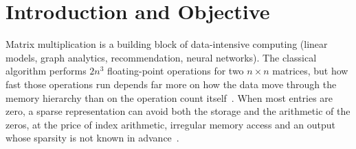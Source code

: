 \documentclass[conference,a4paper]{IEEEtran}
\begin{document}
\section{Introduction and Objective}
\label{sec:intro}
Matrix multiplication is a building block of data-intensive computing (linear models, graph analytics,
recommendation, neural networks). The classical algorithm performs $2n^3$ floating-point operations
for two $n\times n$ matrices, but how fast those operations run depends far more on how the data move
through the memory hierarchy than on the operation count itself~\cite{hennessy2017,goto2008}. When most
entries are zero, a sparse representation can avoid both the storage and the arithmetic of the zeros, at
the price of index arithmetic, irregular memory access and an output whose sparsity is not known in
advance~\cite{gustavson1978,buluc2012}.
\end{document}

